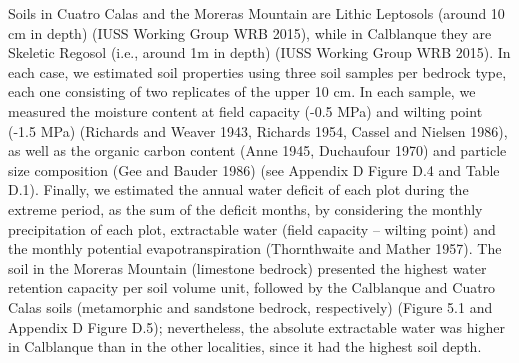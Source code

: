 \documentclass[11pt,twoside]{reedthesis}
\begin{document}
Soils in Cuatro Calas and the Moreras Mountain are Lithic Leptosols
(around 10 cm in depth) (IUSS Working Group WRB 2015), while in
Calblanque they are Skeletic Regosol (i.e., around 1m in depth) (IUSS
Working Group WRB 2015). In each case, we estimated soil properties
using three soil samples per bedrock type, each one consisting of two
replicates of the upper 10 cm. In each sample, we measured the moisture
content at field capacity (-0.5 MPa) and wilting point (-1.5 MPa)
(Richards and Weaver 1943, Richards 1954, Cassel and Nielsen 1986), as
well as the organic carbon content (Anne 1945, Duchaufour 1970) and
particle size composition (Gee and Bauder 1986) (see Appendix D Figure
D.4 and Table D.1). Finally, we estimated the annual water deficit of
each plot during the extreme period, as the sum of the deficit months,
by considering the monthly precipitation of each plot, extractable water
(field capacity -- wilting point) and the monthly potential
evapotranspiration (Thornthwaite and Mather 1957). The soil in the
Moreras Mountain (limestone bedrock) presented the highest water
retention capacity per soil volume unit, followed by the Calblanque and
Cuatro Calas soils (metamorphic and sandstone bedrock, respectively)
(Figure 5.1 and Appendix D Figure D.5); nevertheless, the absolute
extractable water was higher in Calblanque than in the other localities,
since it had the highest soil depth.\par
\end{document}
